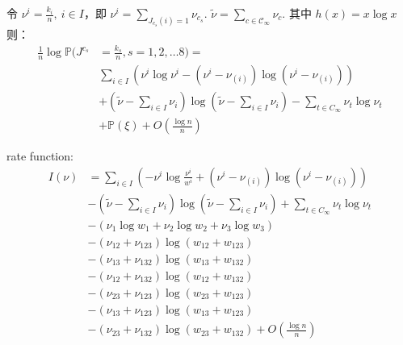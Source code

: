 \documentclass[cn,hazy,egreen,14pt,normal]{elegantnote}
\begin{document}
令 $\nu^{i} = \frac{k_i}{n}, ~i\in I$，即 $\nu^{i} = \sum_{J_{c_s}(i)=1} \nu_{c_s}$.
$\tilde{\nu} = \sum_{c \in \mathcal{C}_{\infty}} \nu_{c}$.
其中 $h(x) = x \log x$
则：  
\begin{align*}
    \frac{1}{n} \log \mathbb{P} (J^{c_s} &= \frac{k_s}{n}, s = 1, 2, \dots 8) = \\
    &\sum_{i \in I} \left(\nu^{i} \log \nu^{i} - (\nu^{i} - \nu_{(i)}) \log(\nu^{i} - \nu_{(i)})\right) \\
    &+(\tilde{\nu} - \sum_{i \in I} \nu_{i}) \log (\tilde{\nu} - \sum_{i \in I} \nu_{i})
    -\sum_{t \in C_{\infty}} \nu_t \log \nu_t \\
    &+ \mathbb{P}(\xi)  + O(\frac{\log n}{n}) 
\end{align*}

rate function:
\begin{align*}
    I(\nu) 
    &= \sum_{i \in I} \left(-\nu^{i} \log \frac{\nu^{i}}{w^{i}} + (\nu^{i} - \nu_{(i)}) \log(\nu^{i} - \nu_{(i)})\right) \\
    &-(\tilde{\nu} - \sum_{i \in I} \nu_i) \log (\tilde{\nu} - \sum_{i \in I} \nu_i)
    +\sum_{t \in C_{\infty}} \nu_t \log \nu_t \\
    &- (\nu_{1} \log w_{1} + \nu_{2} \log w_{2} + \nu_{3} \log w_{3})\\
    &- (\nu_{12} + \nu_{123}) \log(w_{12} + w_{123}) \\
    &- (\nu_{13} + \nu_{132}) \log(w_{13} + w_{132}) \\
    &- (\nu_{12} + \nu_{132}) \log(w_{12} + w_{132}) \\
    &- (\nu_{23} + \nu_{123}) \log(w_{23} + w_{123}) \\
    &- (\nu_{13} + \nu_{123}) \log(w_{13} + w_{123}) \\
    &- (\nu_{23} + \nu_{132}) \log(w_{23} + w_{132}) 
    + O(\frac{\log n}{n}) 
\end{align*}
\end{document}
